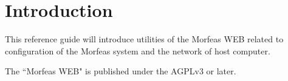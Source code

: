 \section{Introduction}
This reference guide will introduce utilities of the Morfeas WEB related to configuration of the Morfeas system and the network of host computer.

The ``Morfeas WEB" is published under the AGPLv3 or later.
